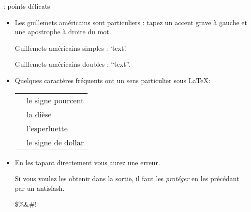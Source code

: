 \documentclass{beamer}
\begin{document}
\begin{frame}[fragile]{\insertsubsection{} : points délicats}
\small
\begin{itemize}
\item Les guillemets américains sont particuliers :
tapez un accent grave \keystroke{\`{}} à gauche et une apostrophe \keystroke{\'{}} à droite du mot.
\begin{exampletwouptiny}
Guillemets américains
simples : `text'.

Guillemets américains
doubles : ``text''.
\end{exampletwouptiny}

\item Quelques caractères fréquents ont un sens particulier sous \LaTeX:\\[1ex]
\begin{tabular}{cl}
\keystrokebftt{\%} & le signe pourcent                 \\
\keystrokebftt{\#} & la dièse                       \\
\keystrokebftt{\&} & l'esperluette                  \\
\keystrokebftt{\$} & le signe de dollar             \\
\end{tabular}
\item En les tapant directement vous aurez une erreur.

Si vous voulez les \mbox{obtenir} dans la sortie, il faut les \emph{protéger} en les précédant par un antislash.
\begin{exampletwoup}
\$\%\&\#!
\end{exampletwoup}
\end{itemize}
\end{frame}
\end{document}
